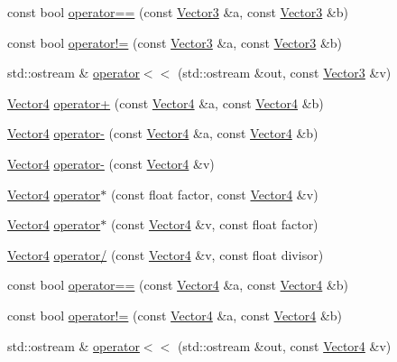 \begin{DoxyCompactItemize}
\item 
const bool \hyperlink{namespaceprism_a2fc2a483f2e3ec622ad2c0ac9699fbcb}{operator==} (const \hyperlink{classprism_1_1_vector3}{Vector3} \&a, const \hyperlink{classprism_1_1_vector3}{Vector3} \&b)
\item 
const bool \hyperlink{namespaceprism_aa752c5d0210902dece31c2fcfc98a824}{operator!=} (const \hyperlink{classprism_1_1_vector3}{Vector3} \&a, const \hyperlink{classprism_1_1_vector3}{Vector3} \&b)
\item 
std\+::ostream \& \hyperlink{namespaceprism_aa7b9367a483153af865552ba486f1196}{operator$<$$<$} (std\+::ostream \&out, const \hyperlink{classprism_1_1_vector3}{Vector3} \&v)
\item 
\hyperlink{classprism_1_1_vector4}{Vector4} \hyperlink{namespaceprism_a4ac9ebc0ce1449793eb8f521c64929a9}{operator+} (const \hyperlink{classprism_1_1_vector4}{Vector4} \&a, const \hyperlink{classprism_1_1_vector4}{Vector4} \&b)
\item 
\hyperlink{classprism_1_1_vector4}{Vector4} \hyperlink{namespaceprism_a038a64f530d1c50bf72cf1a23886ecca}{operator-\/} (const \hyperlink{classprism_1_1_vector4}{Vector4} \&a, const \hyperlink{classprism_1_1_vector4}{Vector4} \&b)
\item 
\hyperlink{classprism_1_1_vector4}{Vector4} \hyperlink{namespaceprism_a147712ae50c37618cbc61f20efe6729f}{operator-\/} (const \hyperlink{classprism_1_1_vector4}{Vector4} \&v)
\item 
\hyperlink{classprism_1_1_vector4}{Vector4} \hyperlink{namespaceprism_aa652a61fe96302693aa0279e832360c7}{operator$\ast$} (const float factor, const \hyperlink{classprism_1_1_vector4}{Vector4} \&v)
\item 
\hyperlink{classprism_1_1_vector4}{Vector4} \hyperlink{namespaceprism_ab3b4a59d9247143b49db3c2778838895}{operator$\ast$} (const \hyperlink{classprism_1_1_vector4}{Vector4} \&v, const float factor)
\item 
\hyperlink{classprism_1_1_vector4}{Vector4} \hyperlink{namespaceprism_a4aa2b9a75c3d5134fc80cc6afc1be443}{operator/} (const \hyperlink{classprism_1_1_vector4}{Vector4} \&v, const float divisor)
\item 
const bool \hyperlink{namespaceprism_a80bdef743a64c754bf1a2b217c82f60a}{operator==} (const \hyperlink{classprism_1_1_vector4}{Vector4} \&a, const \hyperlink{classprism_1_1_vector4}{Vector4} \&b)
\item 
const bool \hyperlink{namespaceprism_a1ffa413af039c2bff07202dcfce55f05}{operator!=} (const \hyperlink{classprism_1_1_vector4}{Vector4} \&a, const \hyperlink{classprism_1_1_vector4}{Vector4} \&b)
\item 
std\+::ostream \& \hyperlink{namespaceprism_aeb86919d9ba71747d21fbd6e28671692}{operator$<$$<$} (std\+::ostream \&out, const \hyperlink{classprism_1_1_vector4}{Vector4} \&v)
\end{DoxyCompactItemize}


